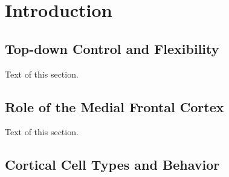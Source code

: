 \chapter{Introduction}

\section{Top-down Control and Flexibility}
Text of this section.

\section{Role of the Medial Frontal Cortex}
Text of this section.

\section{Cortical Cell Types and Behavior}